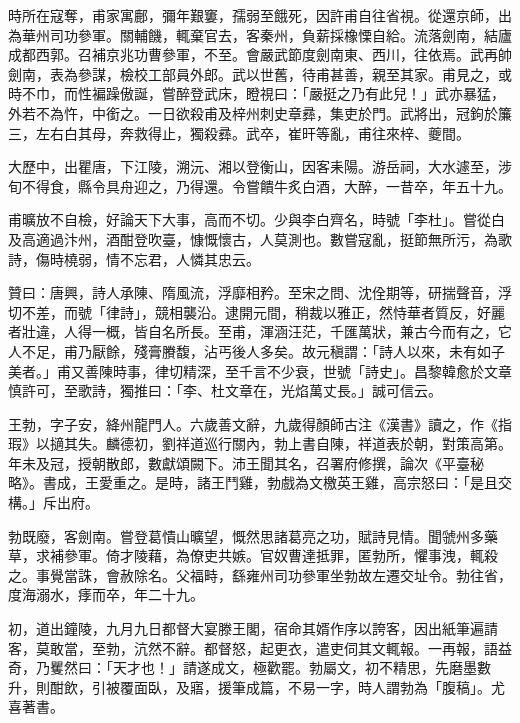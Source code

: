 \begin{pinyinscope}
 時所在寇奪，甫家寓鄜，彌年艱窶，孺弱至餓死，因許甫自往省視。從還京師，出為華州司功參軍。關輔饑，輒棄官去，客秦州，負薪採橡慄自給。流落劍南，結廬成都西郭。召補京兆功曹參軍，不至。會嚴武節度劍南東、西川，往依焉。武再帥劍南，表為參謀，檢校工部員外郎。武以世舊，待甫甚善，親至其家。甫見之，或時不巾，而性褊躁傲誕，嘗醉登武床，瞪視曰：「嚴挺之乃有此兒！」武亦暴猛，外若不為忤，中銜之。一日欲殺甫及梓州刺史章彞，集吏於門。武將出，冠鉤於簾三，左右白其母，奔救得止，獨殺彞。武卒，崔旰等亂，甫往來梓、夔間。



 大歷中，出瞿唐，下江陵，溯沅、湘以登衡山，因客耒陽。游岳祠，大水遽至，涉旬不得食，縣令具舟迎之，乃得還。令嘗饋牛炙白酒，大醉，一昔卒，年五十九。



 甫曠放不自檢，好論天下大事，高而不切。少與李白齊名，時號「李杜」。嘗從白及高適過汴州，酒酣登吹臺，慷慨懷古，人莫測也。數嘗寇亂，挺節無所污，為歌詩，傷時橈弱，情不忘君，人憐其忠云。



 贊曰：唐興，詩人承陳、隋風流，浮靡相矜。至宋之問、沈佺期等，研揣聲音，浮切不差，而號「律詩」，競相襲沿。逮開元間，稍裁以雅正，然恃華者質反，好麗者壯違，人得一概，皆自名所長。至甫，渾涵汪茫，千匯萬狀，兼古今而有之，它人不足，甫乃厭餘，殘膏賸馥，沾丐後人多矣。故元稹謂：「詩人以來，未有如子美者。」甫又善陳時事，律切精深，至千言不少衰，世號「詩史」。昌黎韓愈於文章慎許可，至歌詩，獨推曰：「李、杜文章在，光焰萬丈長。」誠可信云。



 王勃，字子安，絳州龍門人。六歲善文辭，九歲得顏師古注《漢書》讀之，作《指瑕》以擿其失。麟德初，劉祥道巡行關內，勃上書自陳，祥道表於朝，對策高第。年未及冠，授朝散郎，數獻頌闕下。沛王聞其名，召署府修撰，論次《平臺秘略》。書成，王愛重之。是時，諸王鬥雞，勃戲為文檄英王雞，高宗怒曰：「是且交構。」斥出府。



 勃既廢，客劍南。嘗登葛憒山曠望，慨然思諸葛亮之功，賦詩見情。聞虢州多藥草，求補參軍。倚才陵藉，為僚吏共嫉。官奴曹達抵罪，匿勃所，懼事洩，輒殺之。事覺當誅，會赦除名。父福畤，繇雍州司功參軍坐勃故左遷交址令。勃往省，度海溺水，痵而卒，年二十九。



 初，道出鐘陵，九月九日都督大宴滕王閣，宿命其婿作序以誇客，因出紙筆遍請客，莫敢當，至勃，沆然不辭。都督怒，起更衣，遣吏伺其文輒報。一再報，語益奇，乃矍然曰：「天才也！」請遂成文，極歡罷。勃屬文，初不精思，先磨墨數升，則酣飲，引被覆面臥，及寤，援筆成篇，不易一字，時人謂勃為「腹稿」。尤喜著書。




\end{pinyinscope}
